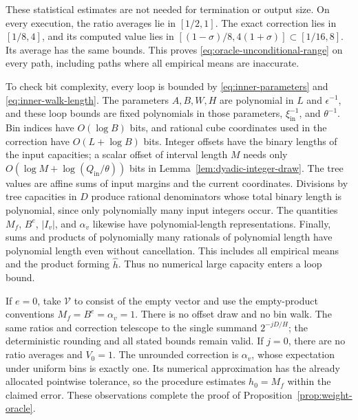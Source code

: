 These statistical estimates are not needed for termination or output
size.  On every execution, the ratio averages lie in $[1/2,1]$.
The exact correction lies in $[1/8,4]$, and its computed value lies in
$[(1-\sigma)/8,4(1+\sigma)]\subset[1/16,8]$.  Its average has the same
bounds.  This proves \eqref{eq:oracle-unconditional-range} on every
path, including paths where all empirical means are inaccurate.

To check bit complexity, every loop is bounded by
\eqref{eq:inner-parameters} and \eqref{eq:inner-walk-length}.
The parameters $A,B,W,H$ are polynomial in $L$ and $\epsilon^{-1}$,
and these loop bounds are fixed polynomials in those parameters,
$\xi_{\mathrm{in}}^{-1}$, and $\theta^{-1}$.  Bin indices have
$O(\log B)$ bits, and rational cube coordinates used in the correction
have $O(L+\log B)$ bits.  Integer offsets have the binary lengths of the
input capacities; a scalar offset of interval length $M$ needs only
$O(\log M+\log(Q_{\mathrm{in}}/\theta))$ bits in
Lemma~\ref{lem:dyadic-integer-draw}.  The tree values are affine sums
of input margins and the current coordinates.  Divisions by tree
capacities in $D$ produce rational denominators whose total binary
length is polynomial, since only polynomially many input integers
occur.  The quantities $M_f$, $B^e$, $|I_v|$, and $\alpha_v$ likewise
have polynomial-length representations.  Finally, sums and products
of polynomially many rationals of polynomial length have polynomial
length even without cancellation.  This includes all empirical means
and the product forming $\widehat h$.  Thus no numerical large
capacity enters a loop bound.

If $e=0$, take $\mathcal V$ to consist of the empty vector and use the
empty-product conventions $M_f=B^e=\alpha_v=1$.  There is no offset
draw and no bin walk.  The same ratios and correction telescope to the
single summand $2^{-jD/H}$; the deterministic rounding and all stated
bounds remain valid.  If $j=0$, there are no ratio averages and
$V_0=1$.  The unrounded correction is $\alpha_v$, whose expectation
under uniform bins is exactly one.  Its numerical approximation has
the already allocated pointwise tolerance, so the procedure estimates
$h_0=M_f$ within the claimed error.  These observations complete the
proof of Proposition~\ref{prop:weight-oracle}.
